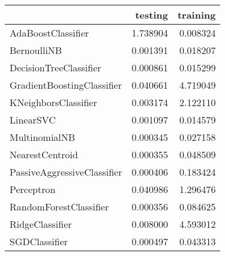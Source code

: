 \begin{tabular}{lrr}
\toprule
{} &   testing &  training \\
\midrule
AdaBoostClassifier          &  1.738904 &  0.008324 \\
BernoulliNB                 &  0.001391 &  0.018207 \\
DecisionTreeClassifier      &  0.000861 &  0.015299 \\
GradientBoostingClassifier  &  0.040661 &  4.719049 \\
KNeighborsClassifier        &  0.003174 &  2.122110 \\
LinearSVC                   &  0.001097 &  0.014579 \\
MultinomialNB               &  0.000345 &  0.027158 \\
NearestCentroid             &  0.000355 &  0.048509 \\
PassiveAggressiveClassifier &  0.000406 &  0.183424 \\
Perceptron                  &  0.040986 &  1.296476 \\
RandomForestClassifier      &  0.000356 &  0.084625 \\
RidgeClassifier             &  0.008000 &  4.593012 \\
SGDClassifier               &  0.000497 &  0.043313 \\
\bottomrule
\end{tabular}
